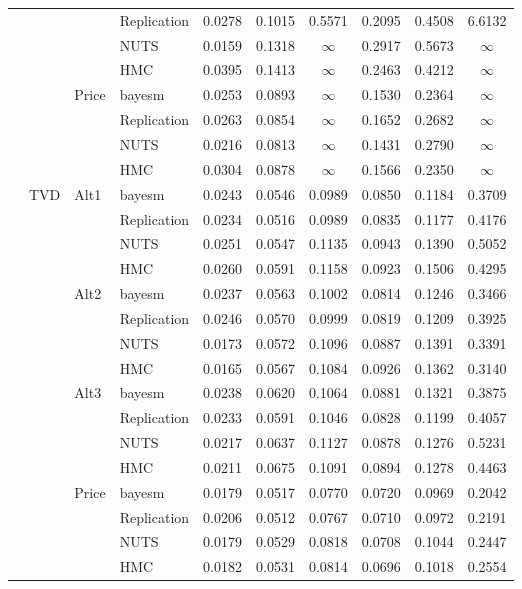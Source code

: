 \begin{longtable}{clllcccccc}
 &  &  & Replication & 0.0278 & 0.1015 & 0.5571 & 0.2095 & 0.4508 & 6.6132 \\
 &  &  & NUTS & 0.0159 & 0.1318 & $\infty$ & 0.2917 & 0.5673 & $\infty$ \\
 &  &  & HMC & 0.0395 & 0.1413 & $\infty$ & 0.2463 & 0.4212 & $\infty$ \\
 &  & Price & bayesm & 0.0253 & 0.0893 & $\infty$ & 0.1530 & 0.2364 & $\infty$ \\
 &  &  & Replication & 0.0263 & 0.0854 & $\infty$ & 0.1652 & 0.2682 & $\infty$ \\
 &  &  & NUTS & 0.0216 & 0.0813 & $\infty$ & 0.1431 & 0.2790 & $\infty$ \\
 &  &  & HMC & 0.0304 & 0.0878 & $\infty$ & 0.1566 & 0.2350 & $\infty$ \\
 & TVD & Alt1 & bayesm & 0.0243 & 0.0546 & 0.0989 & 0.0850 & 0.1184 & 0.3709 \\
 &  &  & Replication & 0.0234 & 0.0516 & 0.0989 & 0.0835 & 0.1177 & 0.4176 \\
 &  &  & NUTS & 0.0251 & 0.0547 & 0.1135 & 0.0943 & 0.1390 & 0.5052 \\
 &  &  & HMC & 0.0260 & 0.0591 & 0.1158 & 0.0923 & 0.1506 & 0.4295 \\
 &  & Alt2 & bayesm & 0.0237 & 0.0563 & 0.1002 & 0.0814 & 0.1246 & 0.3466 \\
 &  &  & Replication & 0.0246 & 0.0570 & 0.0999 & 0.0819 & 0.1209 & 0.3925 \\
 &  &  & NUTS & 0.0173 & 0.0572 & 0.1096 & 0.0887 & 0.1391 & 0.3391 \\
 &  &  & HMC & 0.0165 & 0.0567 & 0.1084 & 0.0926 & 0.1362 & 0.3140 \\
 &  & Alt3 & bayesm & 0.0238 & 0.0620 & 0.1064 & 0.0881 & 0.1321 & 0.3875 \\
 &  &  & Replication & 0.0233 & 0.0591 & 0.1046 & 0.0828 & 0.1199 & 0.4057 \\
 &  &  & NUTS & 0.0217 & 0.0637 & 0.1127 & 0.0878 & 0.1276 & 0.5231 \\
 &  &  & HMC & 0.0211 & 0.0675 & 0.1091 & 0.0894 & 0.1278 & 0.4463 \\
 &  & Price & bayesm & 0.0179 & 0.0517 & 0.0770 & 0.0720 & 0.0969 & 0.2042 \\
 &  &  & Replication & 0.0206 & 0.0512 & 0.0767 & 0.0710 & 0.0972 & 0.2191 \\
 &  &  & NUTS & 0.0179 & 0.0529 & 0.0818 & 0.0708 & 0.1044 & 0.2447 \\
 &  &  & HMC & 0.0182 & 0.0531 & 0.0814 & 0.0696 & 0.1018 & 0.2554 \\

\end{longtable}

